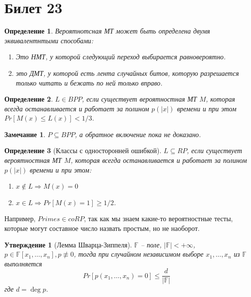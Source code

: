 \documentclass[12pt, letterpaper]{article}
\newtheorem{prop}{Утверждение}[section]
\newtheorem{defi}{Определение}[section]
\newtheorem{note}{Замечание}[section]
\begin{document}
\section{Билет 23}
\begin{defi}
Вероятнотсная МТ может быть определена двумя эквивалентнтыми способами:
\begin{enumerate}
\item Это НМТ, у которой следующий переход выбирается равновероятно.
\item это ДМТ, у которой есть лента случайных битов, которую разрешается только читать и бежать по ней только вправо.
\end{enumerate}
\end{defi}
\begin{defi}
$L \in BPP$, если существует вероятностная МТ $M$, которая всегда останавливается и работает за полином $p(|x|)$ времени и при этом $Pr[M(x) \leq L(x)] < 1/3$. 
\end{defi}
\begin{note}
$P \subseteq BPP$, а обратное включение пока не доказано.
\end{note}
\begin{defi}[Классы с односторонней ошибкой]
$L \subseteq RP$, если существует вероятностная МТ $M$, которая всегда останавливается и работает за полином $p(|x|)$ времени и при этом:
\begin{enumerate}
\item $x \notin L \Longrightarrow M(x) = 0$
\item $x \in L \Longrightarrow Pr[M(x)=1] \geq 1/2$.
\end{enumerate}
\end{defi}
Например, $Primes \in coRP$, так как мы знаем какие-то вероятностные тесты, которые могут составное число назвать простым, но не наоборот.
\begin{prop}[Лемма Шварца-Зиппеля]
$\mathbb{F}$ -- поле, $|\mathbb{F}| < +\infty$, $p \in \mathbb{F}[x_1, \ldots, x_n], p \not\equiv 0$, тогда при случайном независимом выборе $x_1, \ldots, x_n$ из $\mathbb{F}$ выполняется $$
Pr[p(x_1,\ldots,x_n)=0] \leq \frac{d}{|\mathbb{F}|}
$$ где $d=\deg p$.
\end{prop}
\end{document}
